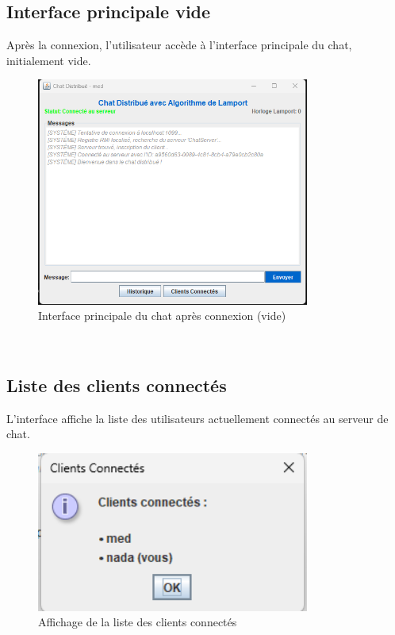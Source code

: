 \documentclass[a4paper,12pt]{article}
\begin{document}
\subsection{Interface principale vide}
Après la connexion, l'utilisateur accède à l'interface principale du chat, initialement vide.

\begin{figure}[ht!]
    \centering
    \includegraphics[width=0.8\textwidth]{chatEmpty.png}
    \caption{Interface principale du chat après connexion (vide)}
\end{figure}
\FloatBarrier\
\subsection{Liste des clients connectés}
L'interface affiche la liste des utilisateurs actuellement connectés au serveur de chat.

\begin{figure}[ht!]
    \centering
    \includegraphics[width=0.8\textwidth]{connectedClients.png}
    \caption{Affichage de la liste des clients connectés}
\end{figure}
\FloatBarrier\
\end{document}
